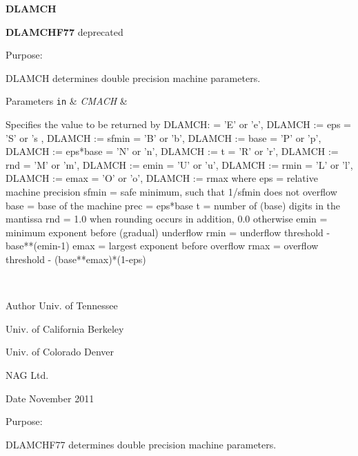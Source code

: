 {\bfseries D\+L\+A\+M\+C\+H} 

{\bfseries D\+L\+A\+M\+C\+H\+F77} deprecated

\begin{DoxyParagraph}{Purpose\+: }
\begin{DoxyVerb} DLAMCH determines double precision machine parameters.\end{DoxyVerb}
 
\end{DoxyParagraph}

\begin{DoxyParams}[1]{Parameters}
\mbox{\tt in}  & {\em C\+M\+A\+C\+H} & \begin{DoxyVerb}          Specifies the value to be returned by DLAMCH:
          = 'E' or 'e',   DLAMCH := eps
          = 'S' or 's ,   DLAMCH := sfmin
          = 'B' or 'b',   DLAMCH := base
          = 'P' or 'p',   DLAMCH := eps*base
          = 'N' or 'n',   DLAMCH := t
          = 'R' or 'r',   DLAMCH := rnd
          = 'M' or 'm',   DLAMCH := emin
          = 'U' or 'u',   DLAMCH := rmin
          = 'L' or 'l',   DLAMCH := emax
          = 'O' or 'o',   DLAMCH := rmax
          where
          eps   = relative machine precision
          sfmin = safe minimum, such that 1/sfmin does not overflow
          base  = base of the machine
          prec  = eps*base
          t     = number of (base) digits in the mantissa
          rnd   = 1.0 when rounding occurs in addition, 0.0 otherwise
          emin  = minimum exponent before (gradual) underflow
          rmin  = underflow threshold - base**(emin-1)
          emax  = largest exponent before overflow
          rmax  = overflow threshold  - (base**emax)*(1-eps)\end{DoxyVerb}
 \\
\hline
\end{DoxyParams}
\begin{DoxyAuthor}{Author}
Univ. of Tennessee 

Univ. of California Berkeley 

Univ. of Colorado Denver 

N\+A\+G Ltd. 
\end{DoxyAuthor}
\begin{DoxyDate}{Date}
November 2011
\end{DoxyDate}
\begin{DoxyParagraph}{Purpose\+: }
\begin{DoxyVerb} DLAMCHF77 determines double precision machine parameters.\end{DoxyVerb}
 
\end{DoxyParagraph}

